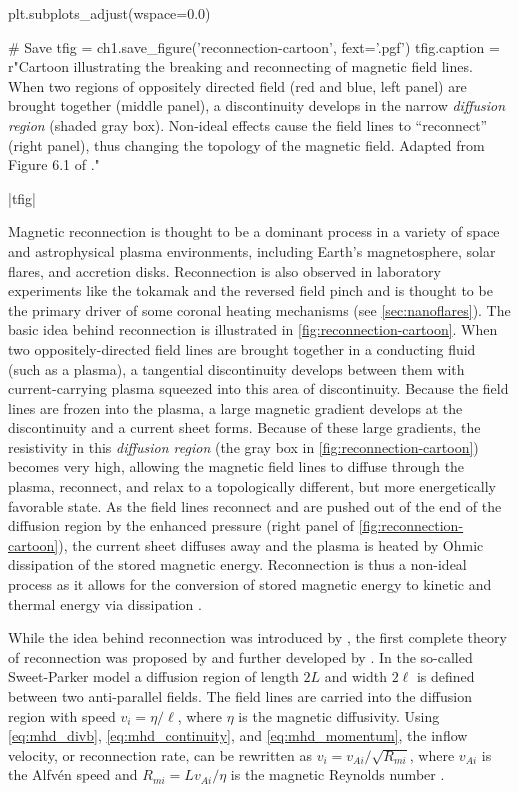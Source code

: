 \begin{pycode}[chapter1]
plt.subplots_adjust(wspace=0.0)

# Save
tfig = ch1.save_figure('reconnection-cartoon', fext='.pgf')
tfig.caption = r"Cartoon illustrating the breaking and reconnecting of magnetic field lines. When two regions of oppositely directed field (red and blue, left panel) are brought together (middle panel), a discontinuity develops in the narrow \textit{diffusion region} (shaded gray box). Non-ideal effects cause the field lines to ``reconnect'' (right panel), thus changing the topology of the magnetic field. Adapted from Figure 6.1 of \citet{priest_magnetohydrodynamics_2014}."
\end{pycode}
\py[chapter1]|tfig|

Magnetic reconnection is thought to be a dominant process in a variety of space and astrophysical plasma environments, including Earth's magnetosphere, solar flares, and accretion disks. Reconnection is also observed in laboratory experiments like the tokamak and the reversed field pinch \citep{priest_magnetic_2000} and is thought to be the primary driver of some coronal heating mechanisms (see \autoref{sec:nanoflares}). The basic idea behind reconnection is illustrated in \autoref{fig:reconnection-cartoon}. When two oppositely-directed field lines are brought together in a conducting fluid (such as a plasma), a tangential discontinuity develops between them with current-carrying plasma squeezed into this area of discontinuity. Because the field lines are frozen into the plasma, a large magnetic gradient develops at the discontinuity and a current sheet forms. Because of these large gradients, the resistivity in this \textit{diffusion region} (the gray box in \autoref{fig:reconnection-cartoon}) becomes very high, allowing the magnetic field lines to diffuse through the plasma, reconnect, and relax to a topologically different, but more energetically favorable state. As the field lines reconnect and are pushed out of the end of the diffusion region by the enhanced pressure (right panel of \autoref{fig:reconnection-cartoon}), the current sheet diffuses away and the plasma is heated by Ohmic dissipation of the stored magnetic energy. Reconnection is thus a non-ideal process as it allows for the conversion of stored magnetic energy to kinetic and thermal energy via dissipation \citep{priest_magnetic_2000,priest_magnetohydrodynamics_2014}.

While the idea behind reconnection was introduced by \citet{dungey_conditions_1953}, the first complete theory of reconnection was proposed by \citet{sweet_neutral_1958} and further developed by \citet{parker_sweets_1957,parker_solar-flare_1963}. In the so-called Sweet-Parker model a diffusion region of length $2L$ and width $2\ell$ is defined between two anti-parallel fields. The field lines are carried into the diffusion region with speed $v_i=\eta/\ell$, where $\eta$ is the magnetic diffusivity. Using \autoref{eq:mhd_divb}, \autoref{eq:mhd_continuity}, and \autoref{eq:mhd_momentum}, the inflow velocity, or reconnection rate, can be rewritten as $v_i=v_{Ai}/\sqrt{R_{mi}}$, where $v_{Ai}$ is the Alfv\'{e}n speed and $R_{mi}=Lv_{Ai}/\eta$ is the magnetic Reynolds number \citep{priest_magnetic_2000}. 

